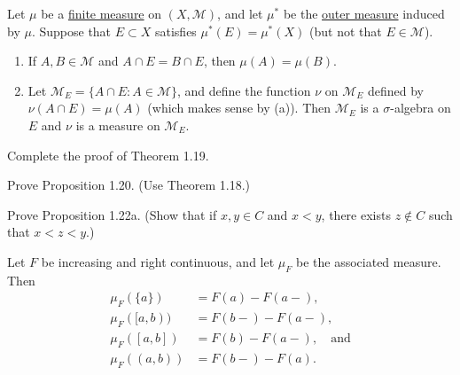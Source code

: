 	\begin{exercise}[Folland 1.24]
		Let $\mu$ be a \hyperref[def:finite-measure]{finite measure} on $(X, \mathcal{M})$, and let $\mu^*$ be the \hyperref[def:outer-measure]{outer measure} induced by $\mu$. Suppose that $E \subset X$ satisfies $\mu^*(E) = \mu^*(X)$ (but not that $E \in \mathcal{M}$).
		\begin{enumerate}[label=\textbf{\alph*.}]
			\item If $A, B \in \mathcal{M}$ and $A \cap E = B \cap E$, then $\mu(A) = \mu(B)$.
			\item Let $\mathcal{M}_E = \{A \cap E : A \in \mathcal{M}\}$, and define the function $\nu$ on $\mathcal{M}_E$ defined by $\nu(A \cap E) = \mu(A)$ (which makes sense by (a)). Then $\mathcal{M}_E$ is a $\sigma$-algebra on $E$ and $\nu$ is a measure on $\mathcal{M}_E$.
		\end{enumerate}
	\end{exercise}
	\begin{solution}

	\end{solution}

	\begin{exercise}[Folland 1.25]
		Complete the proof of Theorem 1.19.
	\end{exercise}
	\begin{solution}

	\end{solution}

	\begin{exercise}[Folland 1.26]
		Prove Proposition 1.20. (Use Theorem 1.18.)
	\end{exercise}
	\begin{solution}

	\end{solution}

	\begin{exercise}[Folland 1.27]
		Prove Proposition 1.22a. (Show that if $x, y \in C$ and $x < y$, there exists $z \notin C$ such that $x < z < y$.)
	\end{exercise}
	\begin{solution}

	\end{solution}

	\begin{exercise}[Folland 1.28]
		Let $F$ be increasing and right continuous, and let $\mu_F$ be the associated measure. Then
		\begin{align}
			\mu_F(\{a\}) &= F(a) - F(a-), \\
			\mu_F([a, b)) &= F(b-) - F(a-), \\
			\mu_F([a, b]) &= F(b) - F(a-), \quad\text{and} \\
			\mu_F((a, b)) &= F(b-) - F(a).
		\end{align}
	\end{exercise}
	\begin{solution}

	\end{solution}


